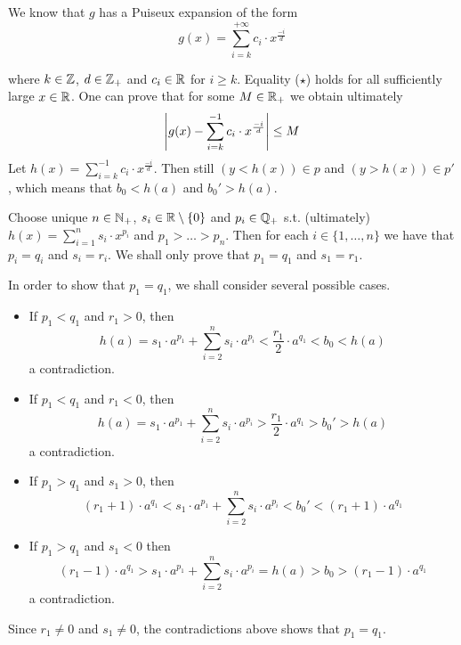 \documentclass[11pt]{article}
\begin{document}
\begin{itemize}
We know that \(g\) has a Puiseux expansion of the form
\begin{equation*}
g(x)=\sum_{i=k}^{+\infty}c_i\cdot x^{\frac{-i}{d}}\tag{\star}
\end{equation*}

where \(k\in\mathbb{Z}\), \(d\in\mathbb{Z}_+\) and \(c_i\in\mathbb{R}\) for \(i\ge k\). Equality (\(\star\)) holds for all sufficiently
large \(x\in\mathbb{R}\). One can prove that for some \(M\in\mathbb{R}_+\) we obtain ultimately
\begin{equation*}
\abs{g(x)-\sum_{i=k}^{-1}c_i\cdot x^{\frac{-i}{d}}}\le M
\end{equation*}
Let \(h(x)=\sum_{i=k}^{-1}c_i\cdot x^{\frac{-i}{d}}\). Then still \((y<h(x))\in p\)
and \((y>h(x))\in p'\), which means that \(b_0<h(a)\) and \(b_0'>h(a)\).

Choose unique \(n\in\mathbb{N}_+\), \(s_i\in\mathbb{R}\setminus\{0\}\) and \(p_i\in\mathbb{Q}_+\) s.t.
(ultimately) \(h(x)=\sum_{i=1}^ns_i\cdot x^{p_i}\) and \(p_1>\dots>p_n\). Then for each \(i\in\{1,\dots,n\}\) we have
that \(p_i=q_i\) and \(s_i=r_i\). We shall only prove that \(p_1=q_1\) and \(s_1=r_1\).

In order to show that \(p_1=q_1\), we shall consider several possible cases.
\begin{itemize}
\item If \(p_1<q_1\) and \(r_1>0\), then
\begin{equation*}
h(a)=s_1\cdot a^{p_1}+\sum_{i=2}^ns_i\cdot a^{p_i}<\frac{r_1}{2}\cdot a^{q_1}<b_0<h(a)
\end{equation*}
a contradiction.
\item If \(p_1<q_1\) and \(r_1<0\), then
\begin{equation*}
h(a)=s_1\cdot a^{p_1}+\sum_{i=2}^ns_i\cdot a^{p_i}>\frac{r_1}{2}\cdot a^{q_1}>b_0'>h(a)
\end{equation*}
a contradiction.
\item If \(p_1>q_1\) and \(s_1>0\), then
\begin{equation*}
(r_1+1)\cdot a^{q_1}<s_1\cdot a^{p_1}+\sum_{i=2}^ns_i\cdot a^{p_i}<b_0'<(r_1+1)\cdot a^{q_1}
\end{equation*}
\item If \(p_1>q_1\) and \(s_1<0\) then
\begin{equation*}
(r_1-1)\cdot a^{q_1}>s_1\cdot a^{p_1}+\sum_{i=2}^ns_i\cdot a^{p_i}=h(a)>b_0>(r_1-1)\cdot a^{q_1}
\end{equation*}
a contradiction.
\end{itemize}
Since \(r_1\neq 0\) and \(s_1\neq 0\), the contradictions above shows that \(p_1=q_1\).


\end{itemize}
\end{document}
